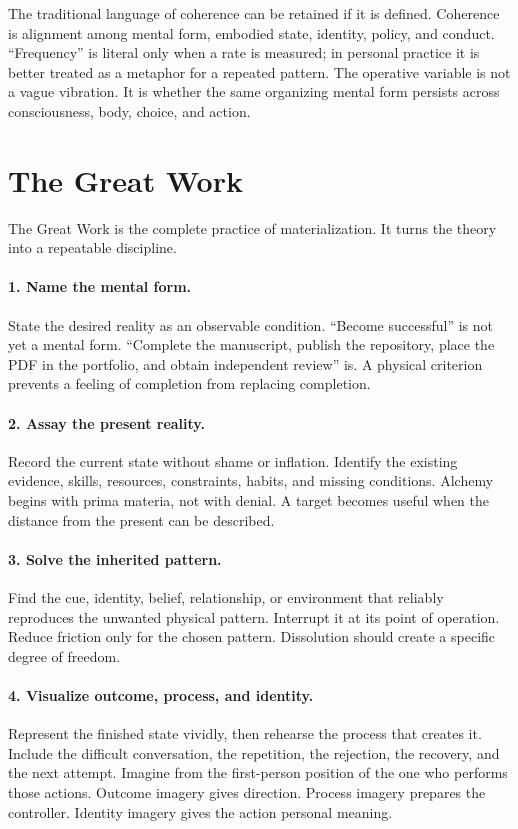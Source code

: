 \documentclass[11pt]{article}
\theoremstyle{plain}
\theoremstyle{definition}
\begin{document}
The traditional language of coherence can be retained if it is defined. Coherence is
alignment among mental form, embodied state, identity, policy, and conduct.
``Frequency'' is literal only when a rate is measured; in personal practice it is
better treated as a metaphor for a repeated pattern. The operative variable is not a
vague vibration. It is whether the same organizing mental form persists across
consciousness, body, choice, and action.

\section{The Great Work}

The Great Work is the complete practice of materialization. It turns the theory into
a repeatable discipline.

\paragraph{1. Name the mental form.}
State the desired reality as an observable condition. ``Become successful'' is not
yet a mental form. ``Complete the manuscript, publish the repository, place the PDF in
the portfolio, and obtain independent review'' is. A physical criterion prevents a
feeling of completion from replacing completion.

\paragraph{2. Assay the present reality.}
Record the current state without shame or inflation. Identify the existing evidence,
skills, resources, constraints, habits, and missing conditions. Alchemy begins with
prima materia, not with denial. A target becomes useful when the distance from the
present can be described.

\paragraph{3. Solve the inherited pattern.}
Find the cue, identity, belief, relationship, or environment that reliably reproduces
the unwanted physical pattern. Interrupt it at its point of operation. Reduce friction
only for the chosen pattern. Dissolution should create a specific degree of freedom.

\paragraph{4. Visualize outcome, process, and identity.}
Represent the finished state vividly, then rehearse the process that creates it.
Include the difficult conversation, the repetition, the rejection, the recovery, and
the next attempt. Imagine from the first-person position of the one who performs those
actions. Outcome imagery gives direction. Process imagery prepares the controller.
Identity imagery gives the action personal meaning.
\end{document}

